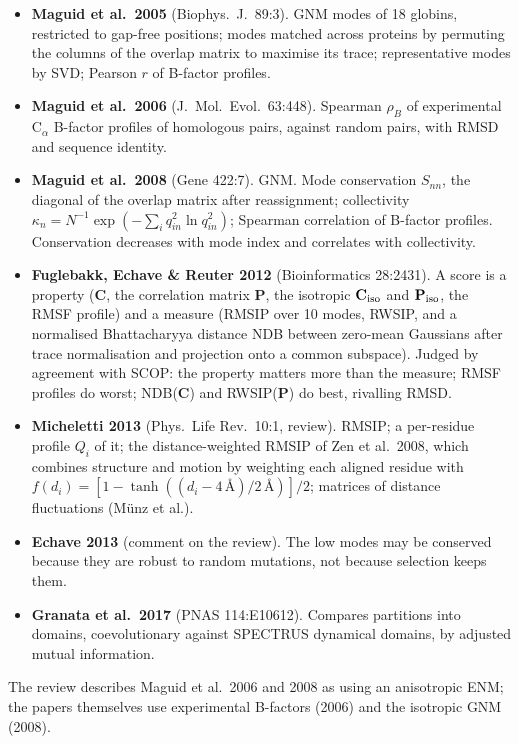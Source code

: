 \documentclass[11pt]{article}
\newcommand{\CC}{\mathbf{C}}
\begin{document}
\begin{itemize}
\item \textbf{Maguid et al.\ 2005} (Biophys.\ J.\ 89:3). GNM modes of 18 globins, restricted to
  gap-free positions; modes matched across proteins by permuting the columns of the overlap
  matrix to maximise its trace; representative modes by SVD; Pearson $r$ of B-factor profiles.
\item \textbf{Maguid et al.\ 2006} (J.\ Mol.\ Evol.\ 63:448). Spearman $\rho_B$ of experimental
  C$_\alpha$ B-factor profiles of homologous pairs, against random pairs, with RMSD and
  sequence identity.
\item \textbf{Maguid et al.\ 2008} (Gene 422:7). GNM. Mode conservation $S_{nn}$, the diagonal of
  the overlap matrix after reassignment; collectivity
  $\kappa_n = N^{-1}\exp(-\sum_i q_{in}^2\ln q_{in}^2)$; Spearman correlation of B-factor
  profiles. Conservation decreases with mode index and correlates with collectivity.
\item \textbf{Fuglebakk, Echave \& Reuter 2012} (Bioinformatics 28:2431). A score is a property
  ($\CC$, the correlation matrix $\mathbf{P}$, the isotropic $\CC_{\rm iso}$ and
  $\mathbf{P}_{\rm iso}$, the RMSF profile) and a measure (RMSIP over 10 modes, RWSIP, and a
  normalised Bhattacharyya distance NDB between zero-mean Gaussians after trace normalisation
  and projection onto a common subspace). Judged by agreement with SCOP: the property matters
  more than the measure; RMSF profiles do worst; NDB($\CC$) and RWSIP($\mathbf{P}$) do best,
  rivalling RMSD.
\item \textbf{Micheletti 2013} (Phys.\ Life Rev.\ 10:1, review). RMSIP; a per-residue profile
  $Q_i$ of it; the distance-weighted RMSIP of Zen et al.\ 2008, which combines structure and
  motion by weighting each aligned residue with
  $f(d_i)=[1-\tanh((d_i-4\,\text{\AA})/2\,\text{\AA})]/2$; matrices of distance fluctuations
  (M\"unz et al.).
\item \textbf{Echave 2013} (comment on the review). The low modes may be conserved because they
  are robust to random mutations, not because selection keeps them.
\item \textbf{Granata et al.\ 2017} (PNAS 114:E10612). Compares partitions into domains,
  coevolutionary against SPECTRUS dynamical domains, by adjusted mutual information.
\end{itemize}

The review describes Maguid et al.\ 2006 and 2008 as using an anisotropic ENM; the papers
themselves use experimental B-factors (2006) and the isotropic GNM (2008).
\end{document}
